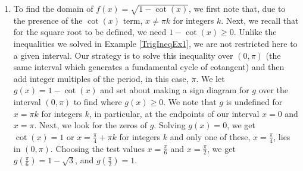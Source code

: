 {\begin{enumerate}
A second approach to the problem exploits the periodic nature of $f$.  Since $\cos(x)$ and $\sin(x)$ have period $2\pi$, it's not too difficult to show the function $f$ repeats itself every $2\pi$ units. (This doesn't necessarily mean the period of $f$ is $2\pi$.  The tangent function is comprised of $\cos(x)$ and $\sin(x)$, but its period is half theirs.  The reader is invited to investigate the period of $f$.)  This means if we can find a formula for the domain on an interval of length $2\pi$, we can express the entire domain by translating our answer left and right on the $x$-axis by adding integer multiples of $2\pi$. One such interval that arises from our domain work is  $\left[\frac{\pi}{3}, \frac{7\pi}{3}\right]$. The portion of the domain here is  $\left(\frac{\pi}{3}, \frac{5\pi}{3}\right) \cup \left(\frac{5\pi}{3}, \frac{7\pi}{3}\right)$.  Adding integer multiples of $2\pi$, we get the family of intervals  $\left(\frac{\pi}{3} + 2\pi k, \frac{5\pi}{3} + 2\pi k \right) \cup \left(\frac{5\pi}{3} + 2\pi k, \frac{7\pi}{3} + 2\pi k\right)$ for integers $k$.  We leave it to the reader to show that getting common denominators leads to our previous answer.

\enlargethispage{2\baselineskip}

\item  To find the domain of $f(x) = \sqrt{1-\cot(x)}$, we first note that, due to the presence of the $\cot(x)$ term, $x \neq \pi k$ for integers $k$.  Next, we recall that for the square root to be defined, we need $1 - \cot(x) \geq 0$.  Unlike the inequalities we solved in Example \ref{TrigIneqEx1}, we are not restricted here to a given interval.  Our strategy is to solve this inequality over $(0,\pi)$  (the same interval which generates a fundamental cycle of cotangent) and then add integer multiples of the period, in this case, $\pi$.  We let $g(x) = 1 - \cot(x)$ and set about making a sign diagram for $g$ over the interval $(0,\pi)$ to find where $g(x) \geq 0$.  We note that $g$ is undefined for $x = \pi k$ for integers $k$, in particular, at the endpoints of our interval $x = 0$ and $x = \pi$. Next, we look for the zeros of $g$.  Solving $g(x) = 0$, we get $\cot(x) = 1$ or $x = \frac{\pi}{4} + \pi k$ for integers $k$ and only one of these, $x = \frac{\pi}{4}$, lies in $(0,\pi)$.   Choosing the test values $x = \frac{\pi}{6}$ and $x = \frac{\pi}{2}$, we get $g\left(\frac{\pi}{6}\right) = 1 - \sqrt{3}$, and $g\left(\frac{\pi}{2}\right) = 1$.  

\begin{center}
\end{center}


\end{enumerate}}
